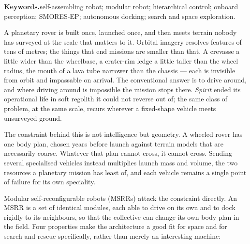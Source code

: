 \documentclass[11pt,a4paper]{article}
\newif\ifreview
\newcommand{\pending}[1]{\ifreview{\color{blue}#1}\else#1\fi}
\newcounter{gsec}
\newcounter{gsub}
\newcommand{\curgsec}{}
\newcommand{\gsep}{\texorpdfstring{\quad}{ }}
\newcommand{\gsection}[1]{%
  \refstepcounter{gsec}%
  \setcounter{gsub}{0}%
  \edef\curgsec{\thegsec}%
  \phantomsection
  \addcontentsline{toc}{section}{\thegsec\gsep #1}%
  \section*{\thegsec\quad #1}%
  \vspace{-1.2ex}\noindent\rule{\textwidth}{0.7pt}\vspace{0.2ex}%
}
\begin{document}
\medskip
\pending{\noindent\textbf{Keywords.}\quad self-assembling robot; modular robot;
hierarchical control; onboard perception; SMORES-EP; autonomous docking; search
and space exploration.}

\clearpage
{\tableofcontents}
\clearpage
{}

\pending{}

\pending{%
A planetary rover is built once, launched once, and then meets terrain nobody
has surveyed at the scale that matters to it. Orbital imagery resolves features
of tens of metres; the things that end missions are smaller than that. A
crevasse a little wider than the wheelbase, a crater-rim ledge a little taller
than the wheel radius, the mouth of a lava tube narrower than the chassis ---
each is invisible from orbit and impassable on arrival. The conventional answer
is to drive around, and where driving around is impossible the mission stops
there. \emph{Spirit} ended its operational life in soft regolith it could not
reverse out of; the same class of problem, at the same scale, recurs wherever a
fixed-shape vehicle meets unsurveyed ground.

The constraint behind this is not intelligence but geometry. A wheeled rover has
one body plan, chosen years before launch against terrain models that are
necessarily coarse. Whatever that plan cannot cross, it cannot cross. Sending
several specialised vehicles instead multiplies launch mass and volume, the two
resources a planetary mission has least of, and each vehicle remains a single
point of failure for its own speciality.

Modular self-reconfigurable robots (MSRRs) attack the constraint directly. An
MSRR is a set of identical modules, each able to drive on its own and to dock
rigidly to its neighbours, so that the collective can change its own body plan
in the field. Four properties make the architecture a good fit for space and
for search and rescue specifically, rather than merely an interesting machine:

}
\end{document}
